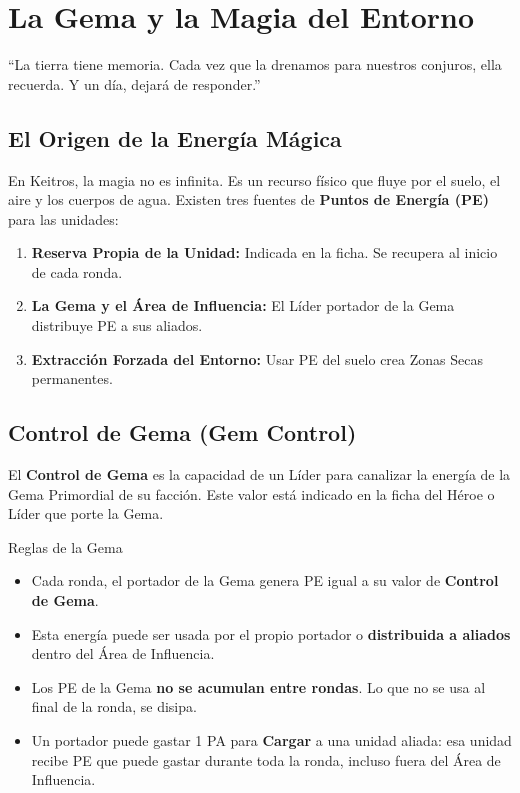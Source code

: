 \label{cap:gema}

\chapter{La Gema y la Magia del Entorno}

\begin{loreblock}
``La tierra tiene memoria. Cada vez que la drenamos para nuestros conjuros, ella recuerda. Y un día, dejará de responder.''
\end{loreblock}

\vspace{0.4cm}

\section{El Origen de la Energía Mágica}

En Keitros, la magia no es infinita. Es un recurso físico que fluye por el suelo, el aire y los cuerpos de agua. Existen tres fuentes de \textbf{Puntos de Energía (PE)} para las unidades:

\begin{enumerate}
    \item \textbf{Reserva Propia de la Unidad:} Indicada en la ficha. Se recupera al inicio de cada ronda.
    \item \textbf{La Gema y el Área de Influencia:} El Líder portador de la Gema distribuye PE a sus aliados.
    \item \textbf{Extracción Forzada del Entorno:} Usar PE del suelo crea Zonas Secas permanentes.
\end{enumerate}

\section{Control de Gema (Gem Control)}

El \textbf{Control de Gema} es la capacidad de un Líder para canalizar la energía de la Gema Primordial de su facción. Este valor está indicado en la ficha del Héroe o Líder que porte la Gema.

\begin{reglaespecial}{Reglas de la Gema}
\begin{itemize}
    \item Cada ronda, el portador de la Gema genera PE igual a su valor de \textbf{Control de Gema}.
    \item Esta energía puede ser usada por el propio portador o \textbf{distribuida a aliados} dentro del Área de Influencia.
    \item Los PE de la Gema \textbf{no se acumulan entre rondas}. Lo que no se usa al final de la ronda, se disipa.
    \item Un portador puede gastar 1 PA para \textbf{Cargar} a una unidad aliada: esa unidad recibe PE que puede gastar durante toda la ronda, incluso fuera del Área de Influencia.
\end{itemize}
\end{reglaespecial}

